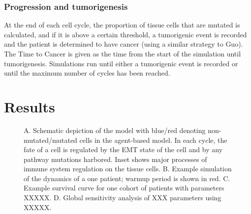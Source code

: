 \documentclass{article}
\begin{document}
\subsubsection{Progression and tumorigenesis}
At the end of each cell cycle, the proportion of tissue cells that are mutated is calculated, and if it is above a certain threshold, a tumorigenic event is recorded and the patient is determined to have cancer (using a similar strategy to Guo). The Time to Cancer is given as the time from the start of the simulation until tumorigenesis. Simulations run until either a tumorigenic event is recorded or until the maximum number of cycles has been reached.



\section{Results}

\begin{figure}[H]
\center
{}
\caption{A. Schematic depiction of the model with blue/red denoting non-mutated/mutated cells in the agent-based model. In each cycle, the fate of a cell is regulated by the EMT state of the cell and by any pathway mutations harbored. Inset shows major processes of immune system regulation on the tissue cells.
B. Example simulation of the dynamics of a one patient; warmup period is shown in red.
C. Example survival curve for one cohort of patients with parameters XXXXX.
D. Global sensitivity analysis of XXX parameters using XXXXX.}
\label{fig:ModelIntro}
\end{figure}
\end{document}
